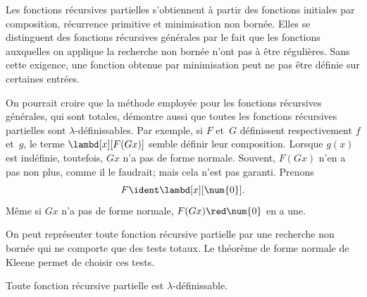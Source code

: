 \documentclass[../../../include/open-logic-section]{subfiles}
\begin{document}

Les fonctions récursives partielles
s'obtiennent à partir des fonctions
initiales par composition, récurrence
primitive et minimisation non bornée.
Elles se distinguent des fonctions
récursives générales par le fait que
les fonctions auxquelles on applique
la recherche non bornée n'ont pas à
être régulières. Sans cette exigence,
une fonction obtenue par minimisation
peut ne pas être définie sur certaines
entrées.

On pourrait croire que la méthode
employée pour les fonctions récursives
générales, qui sont totales, démontre
aussi que toutes les fonctions
récursives partielles sont
$\lambda$-définissables. Par exemple,
si $F$ et~$G$ définissent respectivement
$f$ et~$g$, le terme
$\lambd[x][F(Gx)]$ semble définir
leur composition. Lorsque $g(x)$
est indéfinie, toutefois, $Gx$
n'a pas de forme normale. Souvent,
$F(Gx)$ n'en a pas non plus, comme
il le faudrait; mais cela n'est
pas garanti. Prenons
\[
  F\ident\lambd[x][\num{0}].
\]
Même si $Gx$ n'a pas de forme normale,
$F(Gx)\red\num{0}$ en a une.

On peut représenter toute fonction récursive partielle par une
recherche non bornée qui ne comporte que des tests totaux. Le
théorème de forme normale de Kleene permet de choisir ces tests.

\begin{thm}
Toute fonction récursive partielle est $\lambda$-définissable.
\end{thm}
\end{document}

